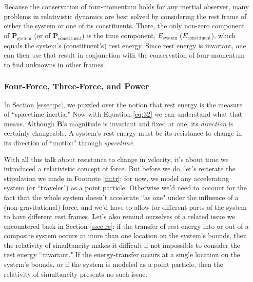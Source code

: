 \documentclass[12pt]{article}
\renewcommand{\vv}[1]{\mathbf{#1}}
\begin{document}
Because the conservation of four-momentum holds for any inertial observer, many problems in relativistic dynamics are best solved by considering the rest frame of either the system or one of its constituents. There, the only non-zero component of $\vv P_{\mathrm{system}}$ (or of $\vv P_{\mathrm{constituent}}$) is the time component, $E_{\mathrm{system}}$ ($E_{\mathrm{constituent}}$), which equals the system's (constituent's) rest energy. Since rest energy is invariant, one can then use that result in conjunction with the conservation of four-momentum to find unknowns in other frames.


\subsubsection{Four-Force, Three-Force, and Power}\label{sssec:ff}

In Section \ref{sssec:pc}, we puzzled over the notion that rest energy is the measure of ``spacetime inertia." Now with Equation \ref{eq:32} we can understand what that means. Although $\vv B$'s magnitude is invariant and fixed at one, its \emph{direction} is certainly changeable. A system's rest energy must be its resistance to change in its direction of ``motion" through \emph{spacetime}.

With all this talk about resistance to change in velocity, it's about time we introduced a relativistic concept of force. But before we do, let's reiterate the stipulation we made in Footnote \ref{fn:tr}: for now, we model any accelerating system (or ``traveler") as a point particle. Otherwise we'd need to account for the fact that the whole system doesn't accelerate ``as one" under the influence of a (non-gravitational) force, and we'd have to allow for different parts of the system to have different rest frames. Let's also remind ourselves of a related issue we encountered back in Section \ref{ssec:re}: if the transfer of rest energy into or out of a composite system occurs at more than one location on the system's bounds, then the relativity of simultaneity makes it difficult if not impossible to consider the rest energy ``invariant." If the energy-transfer occurs at a single location on the system's bounds, or if the system is modeled as a point particle, then the relativity of simultaneity presents no such issue.
\end{document}
